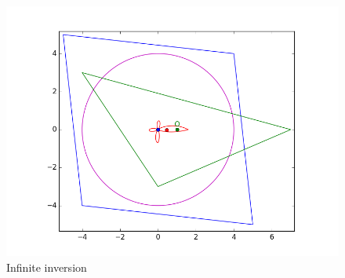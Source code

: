 \documentclass[a4paper,12pt]{article}
\numberwithin{figure}{section}
\begin{document}
        \begin{figure}[H]
            \centering
            \includegraphics[scale=0.75]{./pictures/INVERT_POLYOFFC_POLY_INF}
            \caption{Infinite inversion}
            \label{fig:invmeta}
        \end{figure}
        
    \newpage
    
    \nocite{*}
    \printbibliography
\end{document}
